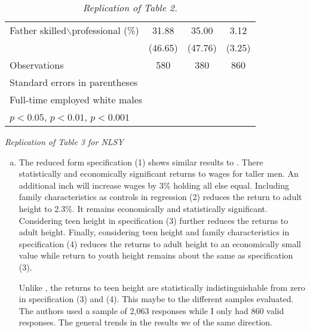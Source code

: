\documentclass[12pt]{article}
\begin{document}
\begin{table}[h!]
\begin{tabular}{|l | c | c | c |}
        \hline
        \tabindent Father skilled$\backslash$professional (\%) &
                                                 31.88 & 35.00 & 3.12 \\
                                              & (46.65) & (47.76) & (3.25) \\
        \hline
        Observations & 580 & 380 & 860 \\
        \hline\hline   
        \multicolumn{4}{l}{\footnotesize Standard errors in parentheses} \\
        \multicolumn{4}{l}{\footnotesize Full-time employed white males} \\
	\multicolumn{4}{l}{\footnotesize \sym{*} \(p<0.05\), \sym{**} \(p<0.01\), 
                        \sym{***} \(p<0.001\)}\\
    \end{tabular}
    \caption{\textit{Replication of \textcite{Persico2004} Table 2.}}
\end{table}

\clearpage

\begin{table}[h!]
	
    \caption{\textit{Replication of \textcite{Persico2004} Table 3 for NLSY}} 
\end{table}
\begin{enumerate}[a.]
    \item The reduced form specification (1) shows similar results to 
    \textcite{Persico2004}.  There statistically and economically significant 
    returns to wages for taller men.  An additional inch will increase wages 
    by 3\% holding all else equal. Including family characteristics as 
    controls in regression (2) reduces the return to adult height to 2.3\%. 
    It remains economically and statistically significant. Considering teen 
    height in specification (3) further reduces the returns to adult height. 
    Finally, considering teen height and family characteristics in specification 
    (4) reduces the returns to adult height to an economically small value 
    while return to youth height remains about the same as specification (3). 
    
    Unlike \textcite{Persico2004}, the returns to teen height are statistically 
    indistinguishable from zero in specification (3) and (4). This 
    maybe to the different samples evaluated.  The authors used a sample of 
    2,063 responses while I only had 860 valid responses. The general trends 
    in the results we of the same direction.
\end{enumerate}

\printbibliography 
\end{document}
